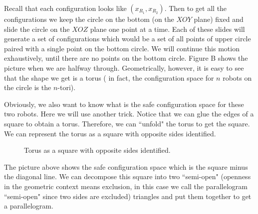 \documentclass[12pt]{article}
\theoremstyle{definition}
\begin{document}
Recall that each configuration looks like $(x_{R_1}, x_{R_2})$.
Then to get all the configurations we keep the circle on the bottom (on the $XOY$ plane) fixed and slide the circle
on the $XOZ$ plane one point at a time. Each of these slides will generate a set of configurations which would be a set
of all points of upper circle paired with a single point on the bottom circle. We will continue this motion exhaustively,
until there are no points on the bottom circle. Figure B shows the picture when we are halfway through. Geometrically,
however, it is easy to see that the shape we get is a torus (\cite{15} in fact, the configuration space for $n$ robots on
the circle is the $n$-tori).

\bigskip

Obviously, we also want to know what is the safe configuration space for these two robots.
Here we will use another trick. Notice that we can glue the edges of a square to obtain a torus.
Therefore, we can ``unfold" the torus to get the square. We can represent the torus as a square
with opposite sides identified.

\begin{figure}[H]
    \centering
    \caption*{Torus as a square with opposite sides identified.}
\end{figure}

The picture above shows the safe configuration space which is the square
minus the diagonal line. We can decompose this square into two ``semi-open"
(openness in the geometric context means exclusion, in this case we call
the parallelogram ``semi-open" since two sides are excluded) triangles
and put them together to get a parallelogram.
\end{document}
